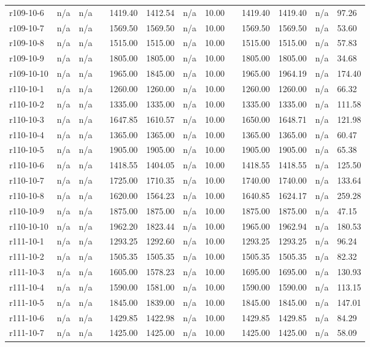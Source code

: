 \documentclass[final,5p,times,twocolumn]{elsarticle}
\begin{document}
{{{{{{{{{{{{{\begin{longtable}{l l l l l l l l l l l l l}
r109-10-6& n/a& n/a&&1419.40& 1412.54& n/a& 10.00&&1419.40& 1419.40& n/a& 97.26\\
r109-10-7& n/a& n/a&&1569.50& 1569.50& n/a& 10.00&&1569.50& 1569.50& n/a& 53.60\\
r109-10-8& n/a& n/a&&1515.00& 1515.00& n/a& 10.00&&1515.00& 1515.00& n/a& 57.83\\
r109-10-9& n/a& n/a&&1805.00& 1805.00& n/a& 10.00&&1805.00& 1805.00& n/a& 34.68\\
r109-10-10& n/a& n/a&&1965.00& 1845.00& n/a& 10.00&&1965.00& 1964.19& n/a& 174.40\\
r110-10-1& n/a& n/a&&1260.00& 1260.00& n/a& 10.00&&1260.00& 1260.00& n/a& 66.32\\
r110-10-2& n/a& n/a&&1335.00& 1335.00& n/a& 10.00&&1335.00& 1335.00& n/a& 111.58\\
r110-10-3& n/a& n/a&&1647.85& 1610.57& n/a& 10.00&&1650.00& 1648.71& n/a& 121.98\\
r110-10-4& n/a& n/a&&1365.00& 1365.00& n/a& 10.00&&1365.00& 1365.00& n/a& 60.47\\
r110-10-5& n/a& n/a&&1905.00& 1905.00& n/a& 10.00&&1905.00& 1905.00& n/a& 65.38\\
r110-10-6& n/a& n/a&&1418.55& 1404.05& n/a& 10.00&&1418.55& 1418.55& n/a& 125.50\\
r110-10-7& n/a& n/a&&1725.00& 1710.35& n/a& 10.00&&1740.00& 1740.00& n/a& 133.64\\
r110-10-8& n/a& n/a&&1620.00& 1564.23& n/a& 10.00&&1640.85& 1624.17& n/a& 259.28\\
r110-10-9& n/a& n/a&&1875.00& 1875.00& n/a& 10.00&&1875.00& 1875.00& n/a& 47.15\\
r110-10-10& n/a& n/a&&1962.20& 1823.44& n/a& 10.00&&1965.00& 1962.94& n/a& 180.53\\
r111-10-1& n/a& n/a&&1293.25& 1292.60& n/a& 10.00&&1293.25& 1293.25& n/a& 96.24\\
r111-10-2& n/a& n/a&&1505.35& 1505.35& n/a& 10.00&&1505.35& 1505.35& n/a& 82.32\\
r111-10-3& n/a& n/a&&1605.00& 1578.23& n/a& 10.00&&1695.00& 1695.00& n/a& 130.93\\
r111-10-4& n/a& n/a&&1590.00& 1581.00& n/a& 10.00&&1590.00& 1590.00& n/a& 113.15\\
r111-10-5& n/a& n/a&&1845.00& 1839.00& n/a& 10.00&&1845.00& 1845.00& n/a& 147.01\\
r111-10-6& n/a& n/a&&1429.85& 1422.98& n/a& 10.00&&1429.85& 1429.85& n/a& 84.29\\
r111-10-7& n/a& n/a&&1425.00& 1425.00& n/a& 10.00&&1425.00& 1425.00& n/a& 58.09\\

\end{longtable}}}}}}}}}}}}}}
\end{document}
